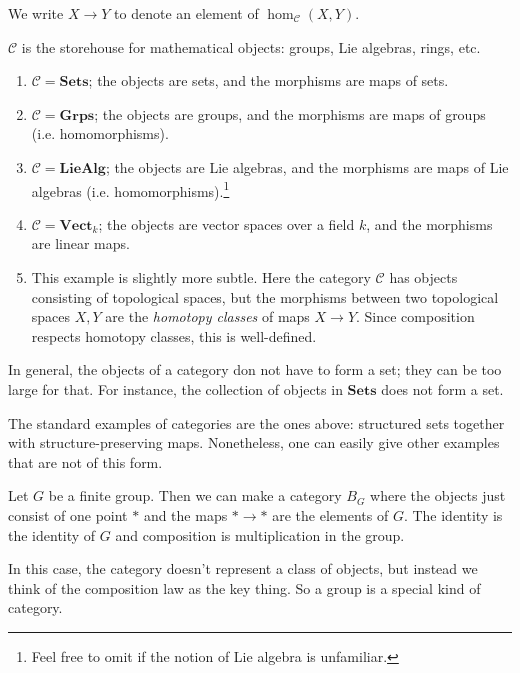 We write $X \to Y$ to denote an element of $\hom_{\mathcal{C}}(X, Y)$.

$\mathcal{C}$ is the storehouse for mathematical objects: groups, Lie algebras,
rings, etc.
\begin{example}
\begin{enumerate}
\item $\mathcal{C}  = \mathbf{Sets}$; the objects are sets, and the morphisms
are maps of sets.
\item $\mathcal{C} = \mathbf{Grps}$; the objects are groups, and the morphisms
are maps of groups (i.e. homomorphisms).
\item $\mathcal{C} = \mathbf{LieAlg}$; the objects are Lie algebras, and the
morphisms are maps of Lie algebras (i.e. homomorphisms).\footnote{Feel free to
omit if the notion of Lie algebra is unfamiliar.}
\item  $\mathcal{C} = \mathbf{Vect}_k$; the objects are vector spaces over a
field $k$, and the morphisms are linear maps.
\item  This example is slightly more subtle. Here the category $\mathcal{C}$
has objects consisting of topological spaces, but the morphisms between two
topological spaces $X,Y$ are the \emph{homotopy classes} of maps $X \to Y$.
Since composition respects homotopy classes, this is well-defined.
\end{enumerate}
\end{example}



In general, the objects of a category don not have to form a set; they can
be too large for
that.
For instance, the collection of objects in $\mathbf{Sets}$ does not form a set.

The standard examples of categories are the ones above: structured sets
together with structure-preserving maps. Nonetheless, one can easily give
other examples that are not of this form.

\begin{example}
Let $G$ be a finite group. Then we can make a category $B_G$ where the objects
just consist of one point $\ast$ and the maps $\ast \to \ast$ are the elements
of $G$. The identity is the identity of $G$ and composition is multiplication
in the group.

In this case, the category doesn't represent  a class of objects, but
instead we think of the composition law as the key thing. So a group is a
special kind of category.
\end{example}

